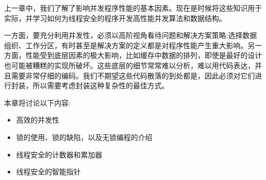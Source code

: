 上一章中，我们了解了影响并发程序性能的基本因素。现在是时候将这些知识用于实际，并学习如何为线程安全的程序开发高性能并发算法和数据结构。

一方面，要充分利用并发性，必须以高阶视角看待问题和解决方案策略:选择数据组织、工作分区，有时甚至是解决方案的定义都是对程序性能产生重大影响。另一方面，性能受到底层因素的极大影响，比如缓存中数据的排列，即使是最好的设计也可能被糟糕的实现所破坏。这些底层的细节常常难以分析，难以用代码表达，并且需要非常仔细的编码。我们不期望这些代码散落的到处都是，因此必须对它们进行封装，所以需要考虑封装这种复杂性的最佳方式。

本章将讨论以下内容:

\begin{itemize}
\item 高效的并发性
\item 锁的使用、锁的缺陷，以及无锁编程的介绍
\item 线程安全的计数器和累加器
\item 线程安全的智能指针
\end{itemize}






